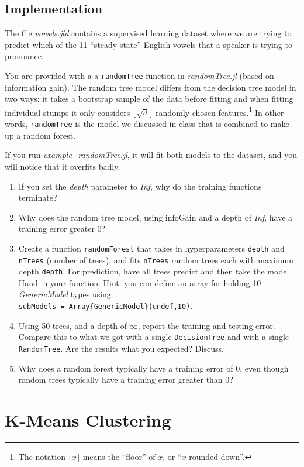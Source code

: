 \documentclass{article}
\def\blu#1{{\color{blu}#1}}
\def\enum#1{\begin{enumerate}#1\end{enumerate}}
\begin{document}
 
 \subsection{Implementation}
 
The file \emph{vowels.jld} contains a supervised learning dataset where we are trying to predict which of the 11 ``steady-state'' English vowels that a speaker is trying to pronounce.

You are provided with a a \texttt{randomTree} function in \emph{randomTree.jl} (based on information gain). The random tree model differs from the decision tree model in two ways: 
it takes a bootstrap sample of the data before fitting and when fitting individual stumps it only considers $\lfloor \sqrt{d} \rfloor$ randomly-chosen features.\footnote{The notation $\lfloor x\rfloor$ means the ``floor'' of $x$, or ``$x$ rounded down''.}  
In other words, \texttt{randomTree} is the model we discussed in class that is combined to make up a random forest.

If you run \emph{example\_randomTree.jl}, it will fit both models to the dataset, and you will notice that it overfits badly.

\blu{
\enum{
\item If you set the \emph{depth} parameter to \emph{Inf}, why do the training functions terminate?
\item Why does the random tree model, using infoGain and a depth of \emph{Inf}, have a training error greater 0?
\item Create a function \texttt{randomForest} that takes in hyperparameters \texttt{depth} and \texttt{nTrees} (number of trees), and 
fits \texttt{nTrees} random trees each with maximum depth \texttt{depth}. For prediction, have all trees predict and then take the mode. Hand in your function. Hint: you can define an array for holding 10 \emph{GenericModel} types using:\\
\texttt{subModels = Array\{GenericModel\}(undef,10)}.
\item Using 50 trees, and a depth of $\infty$, report the training and testing error. Compare this to what we got with a single \texttt{DecisionTree} and with a single \texttt{RandomTree}. Are the results what you expected? Discuss. 
\item Why does a random forest typically have a training error of 0, even though random trees typically have a training error greater than 0?
}
}

\section{K-Means Clustering}
\end{document}
